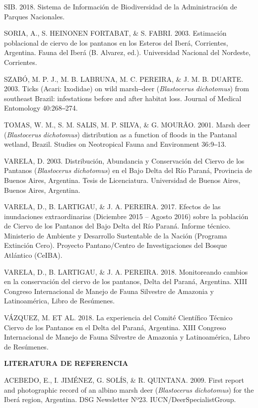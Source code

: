 \documentclass[
  x11names]{article}
\begin{document}
SIB. 2018. Sistema de Información de Biodiversidad de la Administración
de Parques Nacionales.

SORIA, A., S. HEINONEN FORTABAT, \& S. FABRI. 2003. Estimación
poblacional de ciervo de los pantanos en los Esteros del Iberá,
Corrientes, Argentina. Fauna del Iberá (B. Alvarez, ed.). Universidad
Nacional del Nordeste, Corrientes.

SZABÓ, M. P. J., M. B. LABRUNA, M. C. PEREIRA, \& J. M. B. DUARTE. 2003.
Ticks (Acari: Ixodidae) on wild marsh‒deer (\textit{Blastocerus}
\textit{dichotomus}) from southeast Brazil: infestations before and
after habitat loss. Journal of Medical Entomology 40:268‒274.

TOMAS, W. M., S. M. SALIS, M. P. SILVA, \& G. MOURÃO. 2001. Marsh deer
(\textit{Blastocerus} \textit{dichotomus}) distribution as a function of
floods in the Pantanal wetland, Brazil. Studies on Neotropical Fauna and
Environment 36:9‒13.

VARELA, D. 2003. Distribución, Abundancia y Conservación del Ciervo de
los Pantanos (\textit{Blastocerus} \textit{dichotomus}) en el Bajo Delta
del Río Paraná, Provincia de Buenos Aires, Argentina. Tesis de
Licenciatura. Universidad de Buenos Aires, Buenos Aires, Argentina.

VARELA, D., B. LARTIGAU, \& J. A. PEREIRA. 2017. Efectos de las
inundaciones extraordinarias (Diciembre 2015 -- Agosto 2016) sobre la
población de Ciervo de los Pantanos del Bajo Delta del Río Paraná.
Informe técnico. Ministerio de Ambiente y Desarrollo Sustentable de la
Nación (Programa Extinción Cero). Proyecto Pantano/Centro de
Investigaciones del Bosque Atlántico (CeIBA).

VARELA, D., B. LARTIGAU, \& J. A. PEREIRA. 2018. Monitoreando cambios en
la conservación del ciervo de los pantanos, Delta del Paraná, Argentina.
XIII Congreso Internacional de Manejo de Fauna Silvestre de Amazonia y
Latinoamérica, Libro de Resúmenes.

VÁZQUEZ, M. ET AL. 2018. La experiencia del Comité Científico Técnico
Ciervo de los Pantanos en el Delta del Paraná, Argentina. XIII Congreso
Internacional de Manejo de Fauna Silvestre de Amazonia y Latinoamérica,
Libro de Resúmenes.

\noindent\textbf{LITERATURA DE REFERENCIA}

ACEBEDO, E., I. JIMÉNEZ, G. SOLÍS, \& R. QUINTANA. 2009. First report
and photographic record of an albino marsh deer (\textit{Blastocerus}
\textit{dichotomus}) for the Iberá region, Argentina. DSG Newsletter
Nº23. IUCN/DeerSpecialistGroup.
\end{document}
